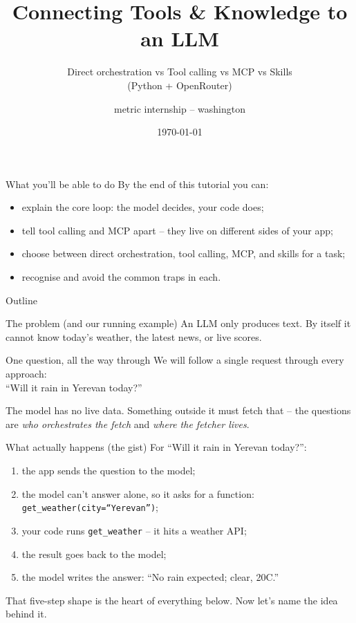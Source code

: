 \documentclass[aspectratio=169,10pt]{beamer}
\title[LLM Assistant: 4 Approaches]{Connecting Tools \& Knowledge to an LLM}
\subtitle{Direct orchestration vs Tool calling vs MCP vs Skills \\ (Python + OpenRouter)}
\author{metric internship -- washington}
\date{\today}
\begin{document}
\begin{frame}
  \titlepage
\end{frame}

\begin{frame}{What you'll be able to do}
  By the end of this tutorial you can:
  \begin{itemize}
    \item explain the core loop: \alert{the model decides, your code does};
    \item tell \alert{tool calling} and \alert{MCP} apart -- they live on different sides of your app;
    \item \alert{choose} between direct orchestration, tool calling, MCP, and skills for a task;
    \item recognise and avoid the \alert{common traps} in each.
  \end{itemize}
\end{frame}

\begin{frame}{Outline}
  \tableofcontents
\end{frame}

\begin{frame}{The problem (and our running example)}
  An LLM only produces \alert{text}. By itself it cannot know today's weather, the latest
  news, or live scores.
  \vfill
  \begin{block}{One question, all the way through}
    \centering We will follow a single request through every approach:\\[4pt]
    {\large \alert{``Will it rain in Yerevan today?''}}
  \end{block}
  \vfill
  \footnotesize The model has no live data. Something outside it must fetch that -- the
  questions are \emph{who orchestrates the fetch} and \emph{where the fetcher lives}.
\end{frame}

\begin{frame}{What actually happens (the gist)}
  For \alert{``Will it rain in Yerevan today?''}:
  \begin{enumerate}
    \item the app sends the question to the model;
    \item the model can't answer alone, so it \alert{asks} for a function: \texttt{get\_weather(city=``Yerevan'')};
    \item \alert{your code} runs \texttt{get\_weather} -- it hits a weather API;
    \item the result goes back to the model;
    \item the model writes the answer: ``No rain expected; clear, 20C.''
  \end{enumerate}
  \vfill
  \footnotesize That five-step shape is the heart of everything below. Now let's name the idea behind it.
\end{frame}
\end{document}
